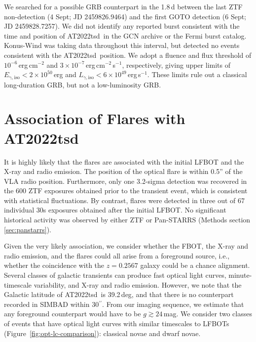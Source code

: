 \documentclass{nature_plusfigure}
\newcommand{\at}{AT2022tsd}
\begin{document}
\begin{methods}
We searched for a possible GRB counterpart in the 1.8\,d between the last ZTF non-detection (4 Sept; JD 2459826.9464) and the first GOTO detection (6 Sept; JD 2459828.7257). We did not identify any reported burst consistent with the time and position of \at\ in the GCN archive or the Fermi burst catalog. Konus-Wind was taking data throughout this interval, but detected no events consistent with the \at\ position. We adopt a  fluence and flux threshold of $10^{-6}\,$erg\,cm$^{-2}$ and $3\times10^{-7}\,$erg\,cm$^{-2}$\,s$^{-1}$, respectively\cite{Tsvetkova2017},
giving upper limits of $E_\mathrm{\gamma,iso}<2\times10^{50}\,$erg and $L_{\gamma,\mathrm{iso}}<6\times10^{49}\,$erg\,s$^{-1}$.
These limits rule out a classical long-duration GRB, but not a low-luminosity GRB\cite{Cano2017}.

\section{Association of Flares with \at}
\label{sec:flare-association}

It is highly likely that the flares are associated with the initial LFBOT and the X-ray and radio emission. The position of the optical flare is within 0.5'' of the VLA radio position. Furthermore, only one 3.2-sigma detection was recovered in the 600 ZTF exposures obtained prior to the transient event, which is consistent with statistical fluctuations. By contrast, flares were detected in three out of 67 individual 30s exposures obtained after the initial LFBOT. No significant historical activity was observed by either ZTF or Pan-STARRS\cite{Fulton2022} (Methods section \ref{sec:panstarrs}). 

Given the very likely association, we consider whether the FBOT, the X-ray and radio emission, and the flares could all arise from a foreground source, i.e., whether the coincidence with the $z=0.2567$ galaxy could be a chance alignment. 
Several classes of galactic transients can produce fast optical light curves, minute-timescale variability, and X-ray and radio emission. However, we note that the Galactic latitude of \at\ is 39.2\,deg, and that there is no counterpart recorded in SIMBAD within 30$^{\prime\prime}$. From our imaging sequence, we estimate that any foreground counterpart would have to be $g \gtrsim 24\,$mag. We consider two classes of events that have optical light curves with similar timescales to LFBOTs (Figure~\ref{fig:opt-lc-comparison}): classical novae and dwarf novae.


\end{methods}
\end{document}

